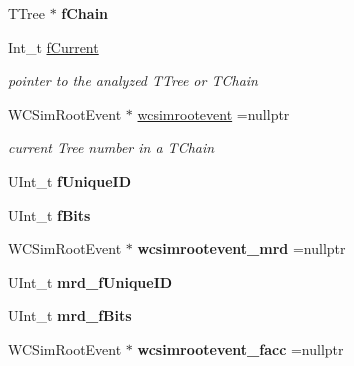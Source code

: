 \begin{DoxyCompactItemize}
\item 
\hypertarget{classwcsimT_a5c98538e1fd01d831ed2c26ccb24ec4e}{T\-Tree $\ast$ {\bfseries f\-Chain}}\label{classwcsimT_a5c98538e1fd01d831ed2c26ccb24ec4e}

\item 
\hypertarget{classwcsimT_afdb949d4952d83d8d99a7e4540b6b6e1}{Int\-\_\-t \hyperlink{classwcsimT_afdb949d4952d83d8d99a7e4540b6b6e1}{f\-Current}}\label{classwcsimT_afdb949d4952d83d8d99a7e4540b6b6e1}

\begin{DoxyCompactList}\small\item\em pointer to the analyzed T\-Tree or T\-Chain \end{DoxyCompactList}\item 
\hypertarget{classwcsimT_a9c27e0faaac735ca39c6a86dfd026178}{W\-C\-Sim\-Root\-Event $\ast$ \hyperlink{classwcsimT_a9c27e0faaac735ca39c6a86dfd026178}{wcsimrootevent} =nullptr}\label{classwcsimT_a9c27e0faaac735ca39c6a86dfd026178}

\begin{DoxyCompactList}\small\item\em current Tree number in a T\-Chain \end{DoxyCompactList}\item 
\hypertarget{classwcsimT_afc0d2d8a92351a9f3a4747b8abcde647}{U\-Int\-\_\-t {\bfseries f\-Unique\-I\-D}}\label{classwcsimT_afc0d2d8a92351a9f3a4747b8abcde647}

\item 
\hypertarget{classwcsimT_a9209d40fc60edd183e5d13246ce3c5ab}{U\-Int\-\_\-t {\bfseries f\-Bits}}\label{classwcsimT_a9209d40fc60edd183e5d13246ce3c5ab}

\item 
\hypertarget{classwcsimT_a97ea4ca240a2d0fc780353712d99938b}{W\-C\-Sim\-Root\-Event $\ast$ {\bfseries wcsimrootevent\-\_\-mrd} =nullptr}\label{classwcsimT_a97ea4ca240a2d0fc780353712d99938b}

\item 
\hypertarget{classwcsimT_a5b73ff1e61e0e849285c22c6e0c366e4}{U\-Int\-\_\-t {\bfseries mrd\-\_\-f\-Unique\-I\-D}}\label{classwcsimT_a5b73ff1e61e0e849285c22c6e0c366e4}

\item 
\hypertarget{classwcsimT_a3214c3f17cb228fd289f5f2879ad8c32}{U\-Int\-\_\-t {\bfseries mrd\-\_\-f\-Bits}}\label{classwcsimT_a3214c3f17cb228fd289f5f2879ad8c32}

\item 
\hypertarget{classwcsimT_a5f0e97c519e0c568630d9c0e006a4851}{W\-C\-Sim\-Root\-Event $\ast$ {\bfseries wcsimrootevent\-\_\-facc} =nullptr}\label{classwcsimT_a5f0e97c519e0c568630d9c0e006a4851}


\end{DoxyCompactItemize}
